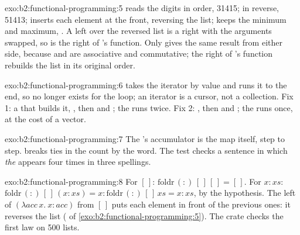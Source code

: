 \begin{solution}{exo:b2:functional-programming:5}
 reads the digits in order, 31415;  in reverse, 51413;  inserts each element at the front,
reversing the list;  keeps the minimum and maximum, . A left  over the reversed list is a right
 with the arguments swapped, so  is the right  of 's function. Only  gives the same
result from either side, because  and  are associative and commutative; the right  of
's function rebuilds the list in its original order.
\end{solution}

\begin{solution}{exo:b2:functional-programming:6}
 takes the iterator by value and runs it to the end, so  no longer exists for the loop; an
iterator is a cursor, not a collection. Fix 1: a  that builds it, , then  and ; the  runs twice. Fix 2:
, then  and ; the  runs once, at
the cost of a vector.
\end{solution}

\begin{solution}{exo:b2:functional-programming:7}
The 's accumulator is the map itself,  step to step.  breaks ties in the count by
the word. The test checks a sentence in which \emph{the} appears four times in three spellings.
\end{solution}

\begin{solution}{exo:b2:functional-programming:8}
For $[\,]$: $\mathrm{foldr}\,(:)\,[\,]\,[\,] = [\,]$. For $x : xs$: $\mathrm{foldr}\,(:)\,[\,]\,(x : xs) = x :
\mathrm{foldr}\,(:)\,[\,]\,xs = x : xs$, by the hypothesis. The left  of $(\lambda acc\,x.\ x : acc)$ from
$[\,]$ puts each element in front of the previous ones: it reverses the list ( of
\cref{exo:b2:functional-programming:5}). The crate checks the first law on 500 lists.
\end{solution}

